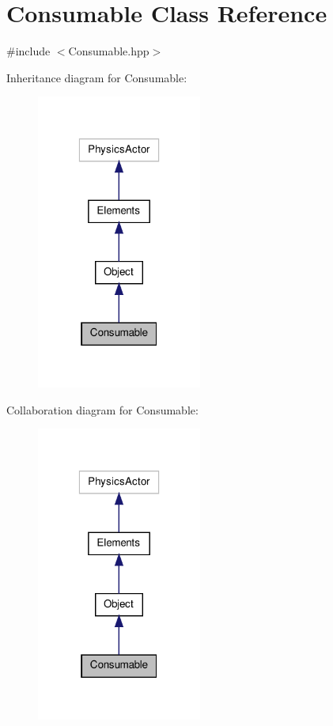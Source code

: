 \hypertarget{class_consumable}{\section{Consumable Class Reference}
\label{class_consumable}
}


{\ttfamily \#include $<$Consumable.\-hpp$>$}



Inheritance diagram for Consumable\-:\nopagebreak
\begin{figure}[H]
\begin{center}
\leavevmode
\includegraphics[width=154pt]{class_consumable__inherit__graph}
\end{center}
\end{figure}


Collaboration diagram for Consumable\-:\nopagebreak
\begin{figure}[H]
\begin{center}
\leavevmode
\includegraphics[width=154pt]{class_consumable__coll__graph}
\end{center}
\end{figure}
